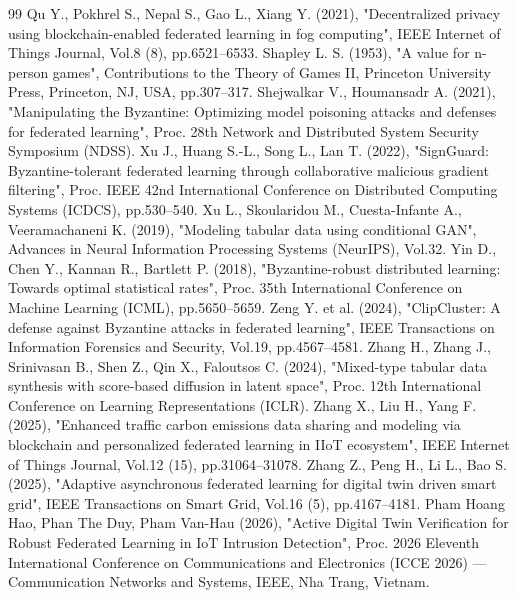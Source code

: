 \begin{thebibliography}{99}
 Qu Y., Pokhrel S., Nepal S., Gao L., Xiang Y. (2021), "Decentralized privacy using blockchain-enabled federated learning in fog computing", IEEE Internet of Things Journal, Vol.8 (8), pp.6521--6533.
 Shapley L. S. (1953), "A value for n-person games", Contributions to the Theory of Games II, Princeton University Press, Princeton, NJ, USA, pp.307--317.
 Shejwalkar V., Houmansadr A. (2021), "Manipulating the Byzantine: Optimizing model poisoning attacks and defenses for federated learning", Proc. 28th Network and Distributed System Security Symposium (NDSS).
 Xu J., Huang S.-L., Song L., Lan T. (2022), "SignGuard: Byzantine-tolerant federated learning through collaborative malicious gradient filtering", Proc. IEEE 42nd International Conference on Distributed Computing Systems (ICDCS), pp.530--540.
 Xu L., Skoularidou M., Cuesta-Infante A., Veeramachaneni K. (2019), "Modeling tabular data using conditional GAN", Advances in Neural Information Processing Systems (NeurIPS), Vol.32.
 Yin D., Chen Y., Kannan R., Bartlett P. (2018), "Byzantine-robust distributed learning: Towards optimal statistical rates", Proc. 35th International Conference on Machine Learning (ICML), pp.5650--5659.
 Zeng Y. et al. (2024), "ClipCluster: A defense against Byzantine attacks in federated learning", IEEE Transactions on Information Forensics and Security, Vol.19, pp.4567--4581.
 Zhang H., Zhang J., Srinivasan B., Shen Z., Qin X., Faloutsos C. (2024), "Mixed-type tabular data synthesis with score-based diffusion in latent space", Proc. 12th International Conference on Learning Representations (ICLR).
 Zhang X., Liu H., Yang F. (2025), "Enhanced traffic carbon emissions data sharing and modeling via blockchain and personalized federated learning in IIoT ecosystem", IEEE Internet of Things Journal, Vol.12 (15), pp.31064--31078.
 Zhang Z., Peng H., Li L., Bao S. (2025), "Adaptive asynchronous federated learning for digital twin driven smart grid", IEEE Transactions on Smart Grid, Vol.16 (5), pp.4167--4181.
 Pham Hoang Hao, Phan The Duy, Pham Van-Hau (2026), "Active Digital Twin Verification for Robust Federated Learning in IoT Intrusion Detection", Proc. 2026 Eleventh International Conference on Communications and Electronics (ICCE 2026) --- Communication Networks and Systems, IEEE, Nha Trang, Vietnam.
\end{thebibliography}
